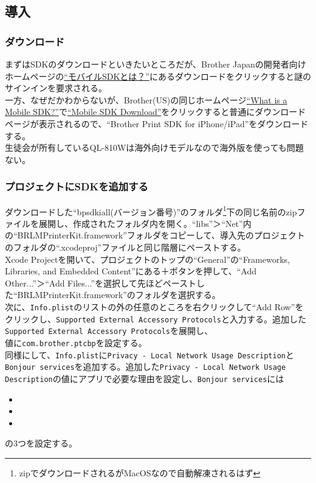 \documentclass[dvipdfmx,jb5]{jreport}
\newcommand{\link}[2]{\href{#2}{#1}}
\begin{document}
\subsection{導入}
\subsubsection{ダウンロード}
まずはSDKのダウンロードといきたいところだが、Brother Japanの開発者向けホームページの\link{``モバイルSDKとは？''}{https://support.brother.co.jp/j/s/es/dev/ja/mobilesdk/index.html?c=jp&lang=ja&navi=offall&comple=on&redirect=on}にあるダウンロードをクリックすると謎のサインインを要求される。 \\
一方、なぜだかわからないが、Brother(US)の同じホームページ\link{``What is a Mobile SDK?''}{https://support.brother.com/g/s/es/dev/en/mobilesdk/index.html?c=eu_ot&lang=en&navi=offall&comple=on&redirect=on}で\link{``Mobile SDK Download''}{https://support.brother.com/g/s/es/dev/en/mobilesdk/download/index.html?c=eu_ot&lang=en&navi=offall&comple=on&redirect=on}をクリックすると普通にダウンロードページが表示されるので、``Brother Print SDK for iPhone/iPad''をダウンロードする。\\
生徒会が所有しているQL-810Wは海外向けモデルなので海外版を使っても問題ない。
\subsubsection{プロジェクトにSDKを追加する}
ダウンロードした``bpsdkiall(バージョン番号)''のフォルダ\footnote{zipでダウンロードされるがMacOSなので自動解凍されるはず}下の同じ名前のzipファイルを展開し、作成されたフォルダ内を開く。``libs''＞``Net''内の``BRLMPrinterKit.framework''フォルダをコピーして、導入先のプロジェクトのフォルダの``.xcodeproj''ファイルと同じ階層にペーストする。\\
Xcode Projectを開いて、プロジェクトのトップの``General''の``Frameworks, Libraries, and Embedded Content''にある＋ボタンを押して、``Add Other...''＞``Add Files...''を選択して先ほどペーストした``BRLMPrinterKit.framework''のフォルダを選択する。\\
次に、\texttt{Info.plist}のリストの外の任意のところを右クリックして``Add Row''をクリックし、\texttt{Supported External Accessory Protocols}と入力する。追加した\texttt{Supported External Accessory Protocols}を展開し、\\値に\texttt{com.brother.ptcbp}を設定する。\\
同様にして、\texttt{Info.plist}に\texttt{Privacy - Local Network Usage Description}と\texttt{Bonjour services}を追加する。追加した\texttt{Privacy - Local Network Usage Description}の値にアプリで必要な理由を設定し、\texttt{Bonjour services}には
\begin{itemize}
      \item {}
      \item {}
      \item {}
\end{itemize}
の3つを設定する。
\end{document}
